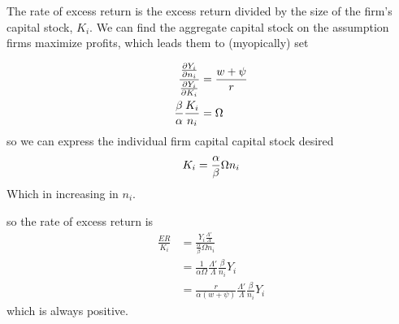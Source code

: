 
The rate of excess return is the excess return divided by the size of the firm's capital stock, $K_i$. We can find the aggregate capital stock on the assumption firms maximize profits, which leads them to (myopically) set 


\begin{eqnarray}
\frac{ \Large{\frac{\partial Y_i}{\partial n_i} }} { \Large \frac{\partial Y_i}{\partial K_i} }&=\frac{ w+\psi }{ r }\nonumber \\
\frac{\beta}{\alpha}\frac{K_i}{n_i} &=\Omega \nonumber
\end{eqnarray}
so we can express the individual firm capital capital stock desired 
\begin{equation}
K_i =\frac{\alpha}{\beta}\Omega n_i\\
\end{equation}
Which in increasing in $n_i$.
 
so the rate of excess return is 
\begin{eqnarray}
\frac{ER}{K_i} &=\frac{Y_i   \frac{\Lambda' }{\Lambda}}  {\frac{\alpha}{\beta}\Omega n_i }   \nonumber\\
&=\frac{ 1}  {\alpha\Omega }\frac{\Lambda' }{\Lambda}\frac{\beta}{n_i }Y_i    \nonumber \\
&=\frac{ r}  {\alpha(w+\psi) }\frac{\Lambda' }{\Lambda}\frac{\beta}{n_i }Y_i 
\end{eqnarray}
which is always positive. %






